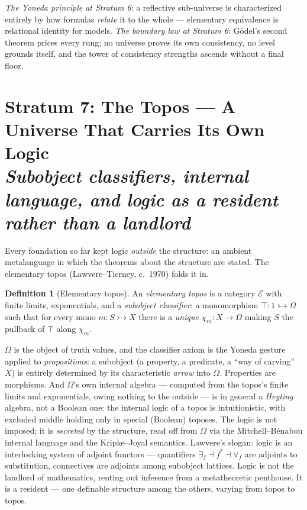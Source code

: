 \documentclass[11pt]{article}
\theoremstyle{plain}
\theoremstyle{definition}
\newtheorem{definition}[theorem]{Definition}
\theoremstyle{remark}
\newcommand{\stratum}[2]{\section{#1 \\ {\normalsize\normalfont\itshape #2}}}
\begin{document}
\begin{refrain}
\emph{The Yoneda principle at Stratum 6}: a reflective sub-universe is characterized entirely by how formulas \emph{relate} it to the whole --- elementary equivalence is relational identity for models. \emph{The boundary law at Stratum 6}: G\"odel's second theorem prices every rung; no universe proves its own consistency, no level grounds itself, and the tower of consistency strengths ascends without a final floor.
\end{refrain}

\stratum{Stratum 7: The Topos --- A Universe That Carries Its Own Logic}{Subobject classifiers, internal language, and logic as a resident rather than a landlord}

Every foundation so far kept logic \emph{outside} the structure: an ambient metalanguage in which the theorems about the structure are stated. The elementary topos (Lawvere--Tierney, c.\ 1970) folds it in.

\begin{definition}[Elementary topos]
An \emph{elementary topos} is a category $\mathcal{E}$ with finite limits, exponentials, and a \emph{subobject classifier}: a monomorphism $\top\colon 1 \rightarrowtail \Omega$ such that for every mono $m\colon S \rightarrowtail X$ there is a \emph{unique} $\chi_m\colon X \to \Omega$ making $S$ the pullback of $\top$ along $\chi_m$.
\end{definition}

$\Omega$ is the object of truth values, and the classifier axiom is the Yoneda gesture applied to \emph{propositions}: a subobject (a property, a predicate, a ``way of carving'' $X$) is entirely determined by its characteristic \emph{arrow} into $\Omega$. Properties are morphisms. And $\Omega$'s own internal algebra --- computed from the topos's finite limits and exponentials, owing nothing to the outside --- is in general a \emph{Heyting} algebra, not a Boolean one: the internal logic of a topos is intuitionistic, with excluded middle holding only in special (Boolean) toposes. The logic is not imposed; it is \emph{secreted} by the structure, read off from $\Omega$ via the Mitchell--B\'enabou internal language and the Kripke--Joyal semantics. Lawvere's slogan: logic is an interlocking system of adjoint functors --- quantifiers $\exists_f \dashv f^* \dashv \forall_f$ are adjoints to substitution, connectives are adjoints among subobject lattices. Logic is not the landlord of mathematics, renting out inference from a metatheoretic penthouse. It is a resident --- one definable structure among the others, varying from topos to topos.
\end{document}
